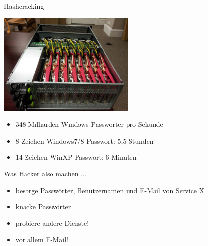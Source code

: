 \begin{frame}{Hashcracking}
    \begin{center}
      \includegraphics[height=5cm]{digitalnatives/hashcat-cluster.jpg}
    \end{center}
    \begin{itemize}
      \item<2-> 348 Milliarden Windows Passwörter pro Sekunde
      \item<2-> 8 Zeichen Windows7/8 Passwort: 5,5 Stunden
      \item<2-> 14 Zeichen WinXP Passwort: 6 Minuten
    \end{itemize}
\end{frame}

\begin{frame}{Was Hacker also machen ...}
  \begin{itemize}
    \item<1-> besorge Passwörter, Benutzernamen und E-Mail von Service X
    \item<2-> knacke Passwörter
    \item<3-> probiere andere Dienste!
    \item<4-> vor allem E-Mail!
  \end{itemize}
\end{frame}

